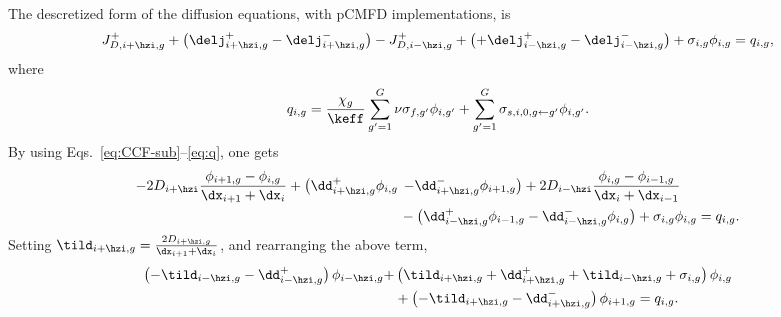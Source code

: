 The descretized form of the diffusion equations, with pCMFD implementations, is
\begin{equation}
  \label{eq:pCMFD-diff1}
  J_{D,i+\hzi,g}^+ +\left( \delj_{i+\hzi,g}^+ - \delj_{i+\hzi,g}^- \right) - J_{D,i-\hzi,g}^+ + \left( + \delj_{i-\hzi,g}^+ - 
  \delj_{i-\hzi,g}^- \right) + \sigma_{i,g}\phi_{i,g} = q_{i,g},
\end{equation}
where
\begin{equation}
  \label{eq:q}
  q_{i,g} = \frac{\chi_g}{\keff}\sum\limits^G_{g'=1}\nu\sigma_{f,g'}\phi_{i,g'} + \sum\limits_{g'=1}^G \sigma_{s,i,0,g\leftarrow g'}\phi_{i,g'}.
\end{equation}
By using Eqs.~\eqref{eq:CCF-sub}--\eqref{eq:q}, one gets
\begin{equation}
  \label{eq:pCMFD-diff2}
  \begin{split}
  -2D_{i+\hzi}\frac{\phi_{i+1,g} - \phi_{i,g}}{\dx_{i+1}+\dx_{i}} +\left( \dd^+_{i+\hzi,g}\phi_{i,g} \right.&\left. - \dd^-_{i+\hzi,g }\phi_{i+1,g}\right)
  +2D_{i-\hzi}\frac{\phi_{i,g} - \phi_{i-1,g}}{\dx_{i}+\dx_{i-1}} \\ 
  &- \left( \dd^+_{i-\hzi,g}\phi_{i-1,g} -\dd^-_{i-\hzi,g}\phi_{i,g}\right) +\sigma_{i,g}\phi_{i,g} = q_{i,g}.
  \end{split}
\end{equation}
Setting $\tild_{i+\hzi,g} = \frac{2D_{i+\hzi,g}}{\dx_{i+1}+\dx_{i}}$, and rearranging the above term, 
\begin{equation}
  \label{eq:pCMFD-rearrange}
  \begin{split}
  \left(-\tild_{i-\hzi,g}-\dd^+_{i-\hzi,g}\right)\phi_{i-\hzi,g} + &\left( \tild_{i+\hzi,g} + \dd^+_{i+\hzi,g}+ \tild_{i-\hzi,g} + \sigma_{i,g}\right)\phi_{i,g} \\
  &+ \left( -\tild_{i+\hzi,g} - \dd^-_{i+\hzi,g}\right)\phi_{i+1,g} = q_{i,g}.
  \end{split}
\end{equation}

